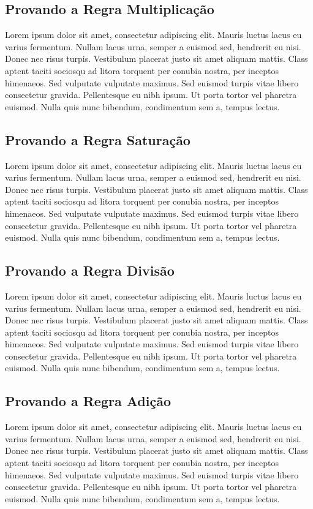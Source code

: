 \documentclass[conference]{IEEEtran}
\begin{document}
\subsection{Provando a Regra Multiplicação}
Lorem ipsum dolor sit amet, consectetur adipiscing elit. Mauris luctus lacus eu varius fermentum. Nullam lacus urna, semper a euismod sed, hendrerit eu nisi. Donec nec risus turpis. Vestibulum placerat justo sit amet aliquam mattis. Class aptent taciti sociosqu ad litora torquent per conubia nostra, per inceptos himenaeos. Sed vulputate vulputate maximus. Sed euismod turpis vitae libero consectetur gravida. Pellentesque eu nibh ipsum. Ut porta tortor vel pharetra euismod. Nulla quis nunc bibendum, condimentum sem a, tempus lectus.

\subsection{Provando a Regra Saturação}
Lorem ipsum dolor sit amet, consectetur adipiscing elit. Mauris luctus lacus eu varius fermentum. Nullam lacus urna, semper a euismod sed, hendrerit eu nisi. Donec nec risus turpis. Vestibulum placerat justo sit amet aliquam mattis. Class aptent taciti sociosqu ad litora torquent per conubia nostra, per inceptos himenaeos. Sed vulputate vulputate maximus. Sed euismod turpis vitae libero consectetur gravida. Pellentesque eu nibh ipsum. Ut porta tortor vel pharetra euismod. Nulla quis nunc bibendum, condimentum sem a, tempus lectus.

\subsection{Provando a Regra Divisão}
Lorem ipsum dolor sit amet, consectetur adipiscing elit. Mauris luctus lacus eu varius fermentum. Nullam lacus urna, semper a euismod sed, hendrerit eu nisi. Donec nec risus turpis. Vestibulum placerat justo sit amet aliquam mattis. Class aptent taciti sociosqu ad litora torquent per conubia nostra, per inceptos himenaeos. Sed vulputate vulputate maximus. Sed euismod turpis vitae libero consectetur gravida. Pellentesque eu nibh ipsum. Ut porta tortor vel pharetra euismod. Nulla quis nunc bibendum, condimentum sem a, tempus lectus.

\subsection{Provando a Regra Adição}
Lorem ipsum dolor sit amet, consectetur adipiscing elit. Mauris luctus lacus eu varius fermentum. Nullam lacus urna, semper a euismod sed, hendrerit eu nisi. Donec nec risus turpis. Vestibulum placerat justo sit amet aliquam mattis. Class aptent taciti sociosqu ad litora torquent per conubia nostra, per inceptos himenaeos. Sed vulputate vulputate maximus. Sed euismod turpis vitae libero consectetur gravida. Pellentesque eu nibh ipsum. Ut porta tortor vel pharetra euismod. Nulla quis nunc bibendum, condimentum sem a, tempus lectus.
\end{document}
